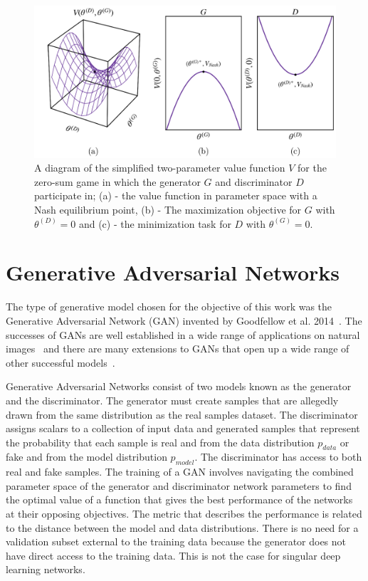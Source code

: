 \documentclass[twocolumn]{article}
\numberwithin{equation}{section}
\begin{document}
\begin{figure}%
\includegraphics[width=15cm]{figures/diagrams/gan_game.png}
\centering
\caption{A diagram of the simplified two-parameter value function $V$ for the zero-sum game in which the generator $G$ and discriminator $D$ participate in; (a) - the value function in parameter space with a Nash equilibrium point, (b) - The maximization objective for $G$ with $\theta^{(D)}=0$ and (c) - the minimization task for $D$ with $\theta^{(G)}=0$.}
\label{fig:gan_game}
\end{figure}

\section{Generative Adversarial Networks}\label{sec:gans}

The type of generative model chosen for the objective of this work was the Generative Adversarial Network (GAN) invented by Goodfellow et al. 2014~\cite{gf_gan}. The successes of GANs are well established in a wide range of applications on natural images~\cite{wgan, karrasgan, largegan} and there are many extensions to GANs that open up a wide range of other successful models~\cite{pix2pix, hiresgan, lapgan}. 

Generative Adversarial Networks consist of two models known as the generator and the discriminator. The generator must create samples that are allegedly drawn from the same distribution as the real samples dataset. The discriminator assigns scalars to a collection of input data and generated samples that represent the probability that each sample is real and from the data distribution $p_{data}$ or fake and from the model distribution  $p_{model}$. The discriminator has access to both real and fake samples. The training of a GAN involves navigating the combined parameter space of the generator and discriminator network parameters to find the optimal value of a function that gives the best performance of the networks at their opposing objectives. The metric that describes the performance is related to the distance between the model and data distributions. There is no need for a validation subset external to the training data because the generator does not have direct access to the training data. This is not the case for singular deep learning networks.
\end{document}

